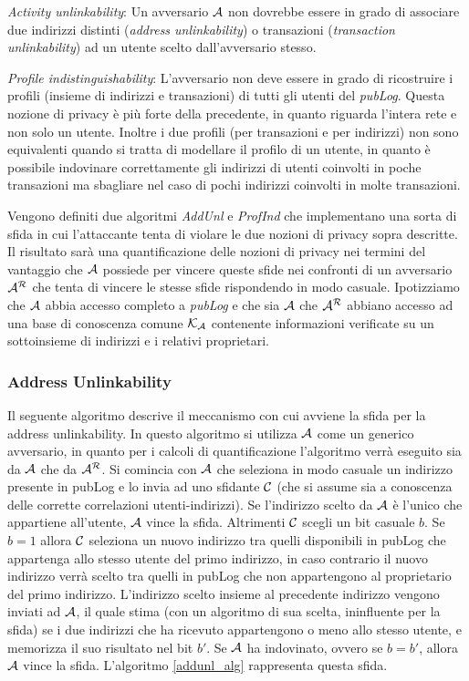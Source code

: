 \emph{Activity unlinkability}: Un avversario $\mathcal{A}$ non dovrebbe essere in grado di associare due indirizzi distinti (\emph{address unlinkability}) o transazioni (\emph{transaction unlinkability}) ad un utente scelto dall'avversario stesso.

\emph{Profile indistinguishability}: L'avversario non deve essere in grado di ricostruire i profili (insieme di indirizzi e transazioni) di tutti gli utenti del \emph{pubLog}. Questa nozione di privacy è più forte della precedente, in quanto riguarda l'intera rete e non solo un utente. Inoltre i due profili (per transazioni e per indirizzi) non sono equivalenti quando si tratta di modellare il profilo di un utente, in quanto è possibile indovinare correttamente gli indirizzi di utenti coinvolti in poche transazioni ma sbagliare nel caso di pochi indirizzi coinvolti in molte transazioni.

Vengono definiti due algoritmi \emph{AddUnl} e \emph{ProfInd} che implementano una sorta di sfida in cui l'attaccante tenta di violare le due nozioni di privacy sopra descritte. Il risultato sarà una quantificazione delle nozioni di privacy nei termini del vantaggio che $\mathcal{A}$ possiede per vincere queste sfide nei confronti di un avversario $\mathcal{A}^\mathcal{R}$ che tenta di vincere le stesse sfide rispondendo in modo casuale. Ipotizziamo che $\mathcal{A}$ abbia accesso completo a \emph{pubLog} e che sia $\mathcal{A}$ che $\mathcal{A}^\mathcal{R}$ abbiano accesso ad una base di conoscenza comune $\mathcal{K}_\mathcal{A}$ contenente informazioni verificate su un sottoinsieme di indirizzi e i relativi proprietari.

\subsubsection{Address Unlinkability}\label{address-unlinkability}

Il seguente algoritmo descrive il meccanismo con cui avviene la sfida per la address unlinkability. In questo algoritmo si utilizza $\mathcal{A}$ come un generico avversario, in quanto per i calcoli di quantificazione l'algoritmo verrà eseguito sia da $\mathcal{A}$ che da $\mathcal{A}^\mathcal{R}$. Si comincia con $\mathcal{A}$ che seleziona in modo casuale un indirizzo presente in pubLog e lo invia ad uno sfidante $\mathcal{C}$ (che si assume sia a conoscenza delle corrette correlazioni utenti-indirizzi). Se l'indirizzo scelto da $\mathcal{A}$ è l'unico che appartiene all'utente, $\mathcal{A}$ vince la sfida. Altrimenti $\mathcal{C}$ scegli un bit casuale $\mathit{b}$. Se $\mathit{b} = 1$ allora $\mathcal{C}$ seleziona un nuovo indirizzo tra quelli disponibili in pubLog che appartenga allo stesso utente del primo indirizzo, in caso contrario il nuovo indirizzo verrà scelto tra quelli in pubLog che non appartengono al proprietario del primo indirizzo. L'indirizzo scelto insieme al precedente indirizzo vengono inviati ad $\mathcal{A}$, il quale stima (con un algoritmo di sua scelta, ininfluente per la sfida) se i due indirizzi che ha ricevuto appartengono o meno allo stesso utente, e memorizza il suo risultato nel bit $\mathit{b}'$. Se $\mathcal{A}$ ha indovinato, ovvero se $\mathit{b} = \mathit{b}'$, allora $\mathcal{A}$ vince la sfida. L'algoritmo \ref{addunl_alg} rappresenta questa sfida.

